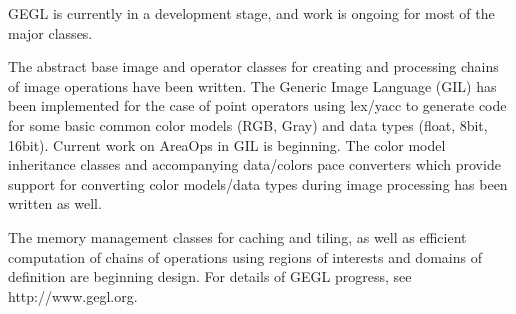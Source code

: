 GEGL is currently in a development stage, and work is ongoing for most of the
major classes.

The abstract base image and operator classes for creating and processing chains
of image operations have been written. The Generic Image Language (GIL) has
been implemented for the case of point operators using lex/yacc to generate
code for some basic common color models (RGB, Gray) and data types (float,
    8bit, 16bit).  Current work on AreaOps in GIL is beginning. The color model
inheritance classes and accompanying data/colors pace converters which provide
support for converting color models/data types during image processing has been
written as well.

The memory management classes for caching and tiling, as well as efficient
computation of chains of operations using regions of interests and domains of
definition are beginning design. For details of GEGL progress, see
http://www.gegl.org.
